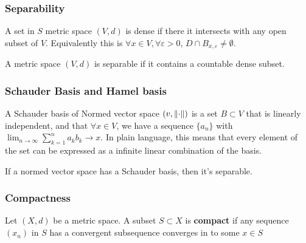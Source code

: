 \documentclass{article}
\begin{document}
\subsubsection{Separability}

\begin{definition}[dense]\rm
	A set in $S$ metric space $(V,d)$ is dense if there it intersects with any open subset of $V$. Equivalently this is $\forall x\in V,\forall \varepsilon>0$, $D\cap B_{x,\varepsilon}\neq \emptyset$.
\end{definition}


\begin{definition}[separable]\rm
	A metric space $(V,d)$ is separable if it contains a countable dense subset.
\end{definition}

\begin{example}\label{separable space example}
\end{example}

\subsubsection{Schauder Basis and Hamel basis}

\begin{definition}\label{Schauder basis}\rm
	A Schauder basis of Normed vector space $(v,\left\|{\cdot}\right\|)$ is a set $B\subset V$ that is linearly independent, and that $\forall x\in V$, we have a sequence $\{a_n\}$ with $\lim_{n\to\infty}\sum_{k=1}^n a_k b_k\to x$. In plain language, this means that every element of the set can be expressed as a infinite linear combination of the basis.
\end{definition}


\begin{proposition}\rm\nextline
	If a normed vector space has a Schauder basis, then it's separable.
\end{proposition}

\begin{definition}\rm\nextline
	\placeholder
\end{definition}

\begin{remark}\rm\nextline
	\placeholder
\end{remark}

\subsubsection{Compactness}
\begin{definition}[Compactness]\label{compactness}\rm\nextline
	Let $(X,d)$ be a metric space. A subset $S\subset X$ is {\bf compact} if any sequence $(x_n)$ in $S$ has a convergent subsequence converges in to some $x\in S$
\end{definition}
\end{document}
